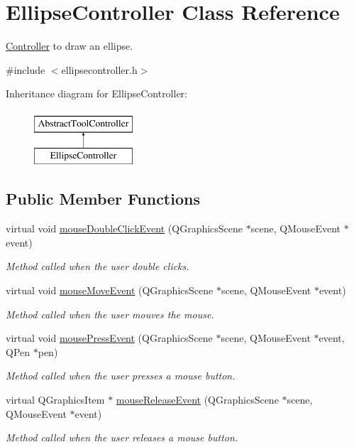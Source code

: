 \hypertarget{classEllipseController}{}\section{Ellipse\+Controller Class Reference}
\label{classEllipseController}


\hyperlink{classController}{Controller} to draw an ellipse.  




{\ttfamily \#include $<$ellipsecontroller.\+h$>$}

Inheritance diagram for Ellipse\+Controller\+:\begin{figure}[H]
\begin{center}
\leavevmode
\includegraphics[height=2.000000cm]{classEllipseController}
\end{center}
\end{figure}
\subsection*{Public Member Functions}
\begin{DoxyCompactItemize}
\item 
virtual void \hyperlink{classEllipseController_ab0741d358017c05d6aceaa62b14ec302}{mouse\+Double\+Click\+Event} (Q\+Graphics\+Scene $\ast$scene, Q\+Mouse\+Event $\ast$event)
\begin{DoxyCompactList}\small\item\em Method called when the user double clicks. \end{DoxyCompactList}\item 
virtual void \hyperlink{classEllipseController_a817bd50d7b449a337ce58ed6a24becf7}{mouse\+Move\+Event} (Q\+Graphics\+Scene $\ast$scene, Q\+Mouse\+Event $\ast$event)
\begin{DoxyCompactList}\small\item\em Method called when the user mouves the mouse. \end{DoxyCompactList}\item 
virtual void \hyperlink{classEllipseController_a396c344582c0119b4e898ba60eb88d76}{mouse\+Press\+Event} (Q\+Graphics\+Scene $\ast$scene, Q\+Mouse\+Event $\ast$event, Q\+Pen $\ast$pen)
\begin{DoxyCompactList}\small\item\em Method called when the user presses a mouse button. \end{DoxyCompactList}\item 
virtual Q\+Graphics\+Item $\ast$ \hyperlink{classEllipseController_a8b9336d05750bafe63d2af6fdcf41458}{mouse\+Release\+Event} (Q\+Graphics\+Scene $\ast$scene, Q\+Mouse\+Event $\ast$event)
\begin{DoxyCompactList}\small\item\em Method called when the user releases a mouse button. \end{DoxyCompactList}\end{DoxyCompactItemize}

